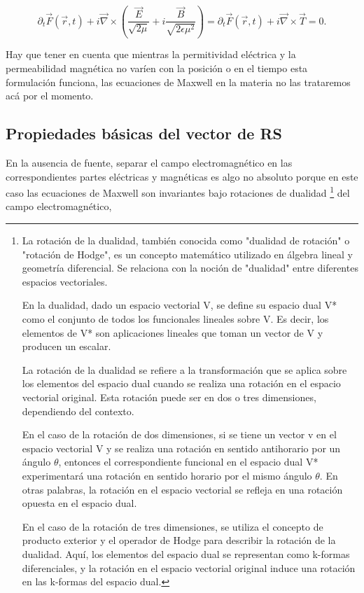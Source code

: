        \begin{equation}
            \partial_t \Vec{F}(\Vec{r},t) + i\Vec{\nabla}\times\left( \frac{\Vec{E}}{\sqrt{2\mu}} + i \frac{\Vec{B}}{\sqrt{2\epsilon\mu^2}}\right) = \partial_t \Vec{F}(\Vec{r},t) + i\Vec{\nabla}\times\Vec{T} = 0.
        \end{equation}

        Hay que tener en cuenta que mientras la permitividad eléctrica y la permeabilidad magnética no varíen con la posición o en el tiempo esta formulación funciona, las ecuaciones de Maxwell en la materia no las trataremos acá por el momento. 

        \subsection{Propiedades básicas del vector de RS}

            En la ausencia de fuente, separar el campo electromagnético en las correspondientes partes eléctricas y magnéticas es algo no absoluto porque en este caso las ecuaciones de Maxwell son invariantes bajo rotaciones de dualidad \footnote{La rotación de la dualidad, también conocida como "dualidad de rotación" o "rotación de Hodge", es un concepto matemático utilizado en álgebra lineal y geometría diferencial. Se relaciona con la noción de "dualidad" entre diferentes espacios vectoriales.

            En la dualidad, dado un espacio vectorial V, se define su espacio dual V* como el conjunto de todos los funcionales lineales sobre V. Es decir, los elementos de V* son aplicaciones lineales que toman un vector de V y producen un escalar.

            La rotación de la dualidad se refiere a la transformación que se aplica sobre los elementos del espacio dual cuando se realiza una rotación en el espacio vectorial original. Esta rotación puede ser en dos o tres dimensiones, dependiendo del contexto.

            En el caso de la rotación de dos dimensiones, si se tiene un vector v en el espacio vectorial V y se realiza una rotación en sentido antihorario por un ángulo $\theta$, entonces el correspondiente funcional en el espacio dual V* experimentará una rotación en sentido horario por el mismo ángulo $\theta$. En otras palabras, la rotación en el espacio vectorial se refleja en una rotación opuesta en el espacio dual.

            En el caso de la rotación de tres dimensiones, se utiliza el concepto de producto exterior y el operador de Hodge para describir la rotación de la dualidad. Aquí, los elementos del espacio dual se representan como k-formas diferenciales, y la rotación en el espacio vectorial original induce una rotación en las k-formas del espacio dual.} del campo electromagnético,

